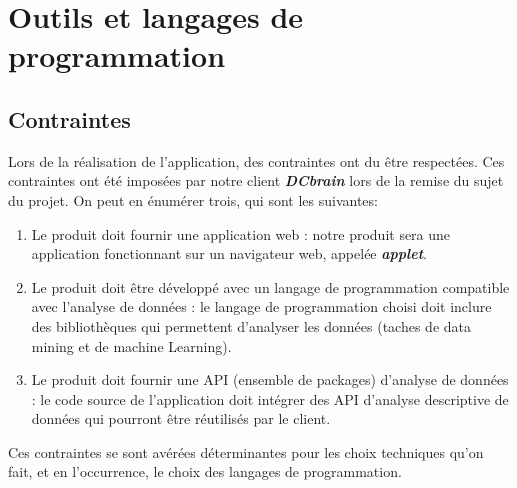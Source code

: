 	\section{Outils et langages de programmation}
		\subsection{Contraintes}
		Lors de la réalisation de l'application, des contraintes ont du être respectées. Ces contraintes ont été imposées par notre client \textbf{\textit{DCbrain}} lors de la remise du sujet du projet. On peut en énumérer trois, qui sont les suivantes:
		\begin{enumerate}
			\item Le produit doit fournir une application web : notre produit sera une application fonctionnant sur un navigateur web, appelée \textbf{\textit{applet}}.
			\item Le produit doit être développé avec un langage de programmation compatible avec l'analyse de données : le langage de programmation choisi doit inclure des bibliothèques qui permettent d'analyser les données (taches de data mining et de machine Learning).
			\item Le produit doit fournir une API (ensemble de packages) d'analyse de données : le code source de l'application doit intégrer des API d'analyse descriptive de données qui pourront être réutilisés par le client.
		\end{enumerate}	
		Ces contraintes se sont avérées déterminantes pour les choix techniques qu'on fait, et en l'occurrence, le choix des langages de programmation. 
		
